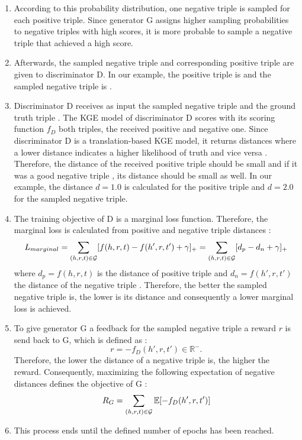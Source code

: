 \begin{enumerate}
    \item
    According to this probability distribution, one negative triple is sampled for each positive triple.
    Since generator G assigns higher sampling probabilities to negative triples with high scores, it is more probable to sample a negative triple that achieved a high score.

    \item 
    Afterwards, the sampled negative triple  and corresponding positive triple  are given to discriminator D.
    In our example, the positive triple is  and the sampled negative triple is .
    
    \item 
    Discriminator D receives as input the sampled negative triple  and the ground truth triple .
    The \ac{KGE} model of discriminator D scores with its scoring function $f_D$ both triples, the received positive and negative one.
    Since discriminator D is a translation-based \ac{KGE} model, it returns distances where a lower distance indicates a higher likelihood of truth and vice versa \cite{cai2017kbgan}.
    Therefore, the distance of the received positive triple  should be small and if it was a good negative triple , its distance should be small as well.
    In our example, the distance $d = 1.0$ is calculated for the positive triple and $d = 2.0$ for the sampled negative triple.
     
    \item 
    The training objective of D is a marginal loss function.
    Therefore, the marginal loss is calculated from positive and negative triple distances \cite{cai2017kbgan}:
     \begin{equation}
        L_{marginal}
        =\sum_{(h,r,t)\in\mathcal{G}}[f(h,r,t)-f(h',r,t')+\gamma]_+ 
        = \sum_{(h,r,t)\in\mathcal{G}}[d_p-d_n+\gamma]_+ 
    \end{equation}
    where $d_p = f(h,r,t)$ is the distance of positive triple  and $d_n = f(h',r,t')$ the distance of the negative triple  .
    Therefore, the better the sampled negative triple is, the lower is its distance and consequently a lower marginal loss is achieved.
    
    \item 
    To give generator G a feedback for the sampled negative triple  a reward $r$ is send back to G, which is defined as \cite{cai2017kbgan}:
    \begin{equation}
        r = -f_D(h',r,t') \in \mathbb{R}^-.
    \end{equation}
    Therefore, the lower the distance of a negative triple is, the higher the reward. 
    Consequently, maximizing the following expectation of negative distances defines the objective of G \cite{cai2017kbgan}:
    \begin{equation}
        R_G=\sum_{(h,r,t)\in\mathcal{G}}\mathbb{E}[-f_D(h',r,t')]
    \end{equation}
    
    \item
    This process ends until the defined number of epochs has been reached.
\end{enumerate}
\clearpage
